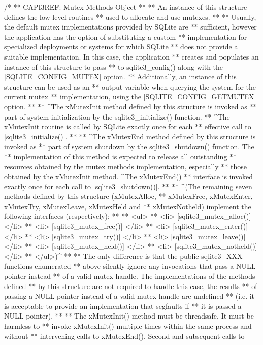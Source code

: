 \begin{Codex}[label=sqlite3.h,numbers=left]
{/*
** CAPI3REF: Mutex Methods Object
**
** An instance of this structure defines the low-level routines
** used to allocate and use mutexes.
**
** Usually, the default mutex implementations provided by SQLite are
** sufficient, however the application has the option of substituting a custom
** implementation for specialized deployments or systems for which SQLite
** does not provide a suitable implementation. In this case, the application
** creates and populates an instance of this structure to pass
** to sqlite3_config() along with the [SQLITE_CONFIG_MUTEX] option.
** Additionally, an instance of this structure can be used as an
** output variable when querying the system for the current mutex
** implementation, using the [SQLITE_CONFIG_GETMUTEX] option.
**
** ^The xMutexInit method defined by this structure is invoked as
** part of system initialization by the sqlite3_initialize() function.
** ^The xMutexInit routine is called by SQLite exactly once for each
** effective call to [sqlite3_initialize()].
**
** ^The xMutexEnd method defined by this structure is invoked as
** part of system shutdown by the sqlite3_shutdown() function. The
** implementation of this method is expected to release all outstanding
** resources obtained by the mutex methods implementation, especially
** those obtained by the xMutexInit method.  ^The xMutexEnd()
** interface is invoked exactly once for each call to [sqlite3_shutdown()].
**
** ^(The remaining seven methods defined by this structure (xMutexAlloc,
** xMutexFree, xMutexEnter, xMutexTry, xMutexLeave, xMutexHeld and
** xMutexNotheld) implement the following interfaces (respectively):
**
** <ul>
**   <li>  [sqlite3_mutex_alloc()] </li>
**   <li>  [sqlite3_mutex_free()] </li>
**   <li>  [sqlite3_mutex_enter()] </li>
**   <li>  [sqlite3_mutex_try()] </li>
**   <li>  [sqlite3_mutex_leave()] </li>
**   <li>  [sqlite3_mutex_held()] </li>
**   <li>  [sqlite3_mutex_notheld()] </li>
** </ul>)^
**
** The only difference is that the public sqlite3_XXX functions enumerated
** above silently ignore any invocations that pass a NULL pointer instead
** of a valid mutex handle. The implementations of the methods defined
** by this structure are not required to handle this case, the results
** of passing a NULL pointer instead of a valid mutex handle are undefined
** (i.e. it is acceptable to provide an implementation that segfaults if
** it is passed a NULL pointer).
**
** The xMutexInit() method must be threadsafe.  It must be harmless to
** invoke xMutexInit() multiple times within the same process and without
** intervening calls to xMutexEnd().  Second and subsequent calls to
}
\end{Codex}
